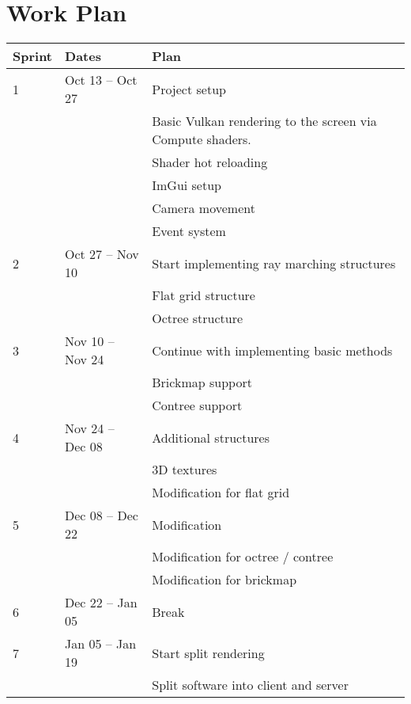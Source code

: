 \section*{Work Plan}






\begin{tabular}{lll}
  Sprint & Dates & Plan \\
  \hline
  1 & Oct 13 -- Oct 27 & Project setup \\
  && Basic Vulkan rendering to the screen via Compute shaders. \\
  && Shader hot reloading \\
  && ImGui setup \\
  && Camera movement \\
  && Event system \\
  \hline
  2 & Oct 27 -- Nov 10 & Start implementing ray marching structures \\
  && Flat grid structure \\
  && Octree structure \\
  \hline
  3 & Nov 10 -- Nov 24 & Continue with implementing basic methods \\
  && Brickmap support \\
  && Contree support \\
  \hline
  4 & Nov 24 -- Dec 08 & Additional structures \\
  && 3D textures \\
  && Modification for flat grid \\
  \hline
  5 & Dec 08 -- Dec 22 & Modification \\
  && Modification for octree / contree \\
  && Modification for brickmap \\
  \hline
  6 & Dec 22 -- Jan 05 & Break \\
  \hline
  7 & Jan 05 -- Jan 19 & Start split rendering\\
  && Split software into client and server \\

\end{tabular}
